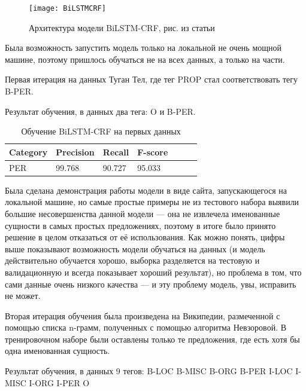 \begin{figure}[H]
\caption{Архитектура модели BiLSTM-CRF, рис. из статьи \cite{ju-etal-2018-neural}}
\texttt{[image: BiLSTMCRF]}
\label{fig:BiLSTMCRF}
\end{figure}


Была возможность запустить модель только на локальной не очень мощной машине, поэтому пришлось обучаться не на всех данных, а только на части.

Первая итерация на данных Туган Тел, где тег PROP стал соответствовать тегу B-PER.

Результат обучения, в данных два тега: O и B-PER.

\vspace{1cm}

\begin{table}[h]
\begin{tabular}{| l | l | l | l | l | l | l |}
\hline
Category               & Precision  &   Recall   &  F-score   \\

\hline
 PER                                 & 99.768     & 90.727     & 95.033      \\
\hline
\end{tabular}
\caption{Обучение BiLSTM-CRF на первых данных}
\end{table}

\vspace{1cm}

Была сделана демонстрация работы модели в виде сайта, запускающегося на локальной машине, но самые простые примеры не из тестового набора выявили большие несовершенства данной модели --- она не извлечела именованные сущности в самых простых предложениях, поэтому в итоге было принято решение в целом отказаться от её использования. %
Как можно понять, цифры выше показывают возможность модели обучаться на данных (и модель действительно обучается хорошо, выборка разделяется на тестовую и валидационную и всегда показывает хороший результат), но проблема в том, что сами данные очень низкого качества --- и эту проблему модель, увы, исправить не может.

Вторая итерация обучения была произведена на Википедии, размеченной с помощью списка n-грамм, полученных с помощью алгоритма Невзоровой. В тренировочном наборе были оставлены только те предложения, где есть хотя бы одна именованная сущность.

Результат обучения, в данных 9 тегов:
B-LOC
B-MISC
B-ORG
B-PER
I-LOC
I-MISC
I-ORG
I-PER
O
\vspace{1cm}

